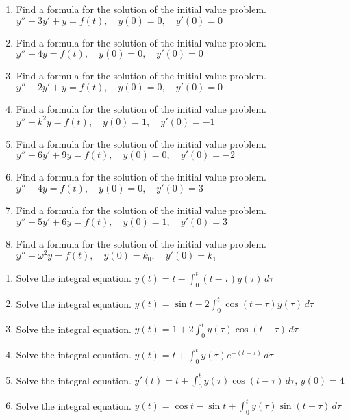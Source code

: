\documentclass{ximera}
\begin{document}
\begin{problem}\label{exer:8.6.3}

\begin{enumerate}
\item Find a formula for the solution of the initial value problem.
$y''+3y'+y=f(t),\quad y(0)=0,\quad y'(0)=0$

\item Find a formula for the solution of the initial value problem.
$y''+4y=f(t),\quad y(0)=0,\quad y'(0)=0$

\item Find a formula for the solution of the initial value problem.
$y''+2y'+y=f(t),\quad y(0)=0,\quad y'(0)=0$

\item Find a formula for the solution of the initial value problem.
$y''+k^2y=f(t),\quad y(0)=1,\quad y'(0)=-1$

\item Find a formula for the solution of the initial value problem.
$y''+6y'+9y=f(t),\quad y(0)=0,\quad y'(0)=-2$

\item Find a formula for the solution of the initial value problem.
$y''-4y=f(t),\quad y(0)=0,\quad y'(0)=3$

\item Find a formula for the solution of the initial value problem.
$y''-5y'+6y=f(t),\quad y(0)=1,\quad y'(0)=3$

\item Find a formula for the solution of the initial value problem.
$y''+\omega^2y=f(t),\quad y(0)=k_0,\quad y'(0)=k_1$
\end{enumerate}
\end{problem}

\begin{problem}\label{exer:8.6.4}

\begin{enumerate}
\item Solve the integral equation.
$y(t)=t-\int_0^t (t-\tau)
y(\tau)\,d\tau$

\item Solve the integral equation.
$y(t)=\sin t-2
\int_0^t\cos (t-\tau) y (\tau)\,d\tau$

\item Solve the integral equation.
$y(t)=1+2
\int_0^ty(\tau)\cos(t-\tau)\,d\tau$

\item Solve the integral equation.
$y(t)=t+\int_0^t
y(\tau)e^{-(t-\tau)}\,d\tau$

\item Solve the integral equation. $y'(t)=t+\int_0^t y(\tau)\cos
(t-\tau)\,d\tau,\, y(0)=4$

\item Solve the integral equation.
$y(t)=\cos t-\sin t+
\int_0^t y(\tau)\sin (t-\tau)\,d\tau$

\end{enumerate}
\end{problem}
\end{document}

